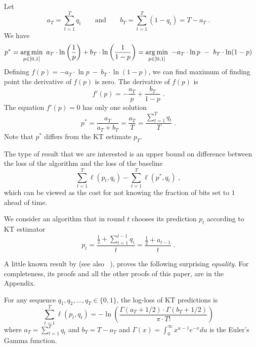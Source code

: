 Let
$$
a_T = \sum_{t=1}^T q_t \qquad \text{and} \qquad b_T = \sum_{t=1}^T (1 - q_t) = T - a_T \; .
$$
We have
\begin{align*}
p^*
= \operatorname*{arg\,min}_{p \in [0,1]} \ a_T \cdot  \ln \left( \frac{1}{p} \right) + b_T \cdot \ln \left( \frac{1}{1-p} \right)
= \operatorname*{arg\,min}_{p \in [0,1]} \ - a_T \cdot  \ln p \ - \  b_T \cdot \ln (1-p)
\end{align*}
Defining $f(p) = - a_T \cdot  \ln p \ - \  b_T \cdot \ln(1-p)$, we can find maximum of
finding point the derivative of $f(p)$ is zero. The derivative of $f(p)$ is
$$
f'(p) = - \frac{a_T}{p} + \frac{b_T}{1-p} \; .
$$
The equation $f'(p) = 0$ has only one solution
$$
p^* = \frac{a_T}{a_T + b_T} = \frac{a_T}{T} = \frac{\sum_{t=1}^T q_t}{T} \; .
$$
Note that $p^*$ differs from the KT estimate $p_T$.

The type of result that we are interested is an upper bound on difference
between the loss of the algorithm and the loss of the baseline
$$
\sum_{t=1}^T \ell(p_t, q_t) - \sum_{t=1}^T \ell(p^*, q_t) \; ,
$$
which can be viewed as the cost for not knowing the fraction of bits set to $1$
ahead of time.


We consider an algorithm that in round $t$ chooses its prediction $p_t$
according to KT estimator
$$
p_t = \frac{\frac{1}{2} + \sum_{t=1}^{t-1} q_i}{t} = \frac{\frac{1}{2} + a_{t-1}}{t} \; .
$$

A little known result by \citep{KrichevskyT81} (see also ~\cite{Cesa-BianchiL06}), proves the following surprising \emph{equality}.
For completeness, its proofs and all the other proofs of this paper, are in the Appendix.
\begin{lemma}
\label{lemma:kt}
For any sequence $q_1, q_2, \dots, q_T \in \{0,1\}$, the log-loss of KT
predictions is
$$
\sum_{t=1}^T \ell(p_t, q_t) =  - \ln \left( \frac{\Gamma(a_T + 1/2) \cdot \Gamma(b_T + 1/2)}{\pi \cdot T!} \right)
$$
where $a_T = \sum_{t=1}^T q_t$ and $b_T = T - a_T$ and $\Gamma(x) =
\int_0^\infty x^{u-1} e^{-x} du$ is the Euler's Gamma function.
\end{lemma}

% 
% 


